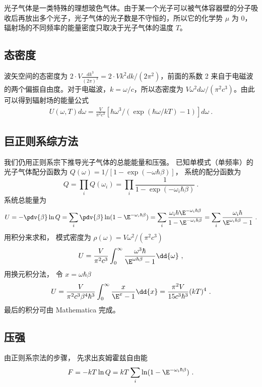 
\begin{issues}
\issueDraft
\end{issues}
光子气体是一类特殊的理想玻色气体。由于某一个光子可以被气体容器壁的分子吸收后再放出多个光子，光子气体的光子数是不守恒的，所以它的化学势 $\mu$ 为 $0$，辐射场的不同频率的能量密度只取决于光子气体的温度 $T$。
\subsection{态密度}
波矢空间的态密度为 $2\cdot V \frac{dk^3}{(2\pi)^3}=2\cdot Vk^2dk/(2\pi^2)$，前面的系数 2 来自于电磁波的两个偏振自由度。对于电磁波，$k=\omega/c$，所以态密度为 $V \omega^2 d\omega/(\pi^2 c^3)$。由此可以得到辐射场的能量公式
\begin{equation}
\begin{aligned}
U(\omega,T) d\omega=\frac{V}{\pi^2c^3} \left[\hbar\omega^3/(\exp(\hbar\omega/kT)-1)\right] d\omega~.
\end{aligned}
\end{equation}

\subsection{巨正则系综方法}
我们仍用正则系宗下推导光子气体的总能能量和压强。 已知单模式（单频率）的光子气体配分函数为 $Q(\omega) = 1/[1-\exp(-\omega\hbar\beta)]$， 系统的配分函数为
\begin{equation}
Q = \prod_i Q(\omega_i) = \prod_i \frac{1}{1-\exp(-\omega_i\hbar\beta)}~.
\end{equation}
系统总能量为
\begin{equation}
U = -\pdv{\beta} \ln Q = \sum_i \pdv{\beta} \ln(1 - \E^{-\omega_i \hbar \beta}) = \sum_i \frac{\omega_i \hbar \E^{-\omega_i \hbar\beta}}{1-\E^{-\omega_i \hbar \beta}} = \sum_i \frac{\omega_i \hbar}{\E^{\omega_i\hbar\beta} - 1}~.
\end{equation}
用积分来求和， 模式密度为 $\rho(\omega) = V\omega^2/(\pi^2 c^3)$
\begin{equation}
U = \frac{V}{\pi^2 c^3} \int_0^\infty \frac{\omega^3 \hbar}{\E^{\omega\hbar\beta} - 1}\dd{\omega}~,
\end{equation}
用换元积分法， 令 $x = \omega\hbar\beta$
\begin{equation}
U = \frac{V}{\pi^2c^3 \beta^4 \hbar^3} \int_0^\infty \frac{x}{\E^x - 1}\dd{x} = \frac{\pi^2 V}{15c^3 \hbar^3} (kT)^4~.
\end{equation}
最后的积分可由 Mathematica 完成。

\subsection{压强}
由正则系宗法的步骤， 先求出亥姆霍兹自由能
\begin{equation}
F = -kT \ln Q = kT \sum_i \ln(1 - \E^{-\omega_i \hbar\beta})~.
\end{equation}
